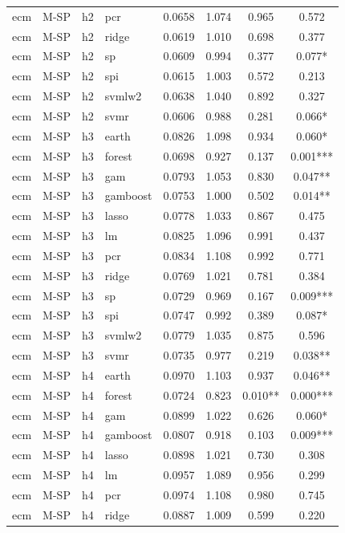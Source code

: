 \begin{ThreePartTable}
\begin{longtable}[t]{llclcccc}
ecm & M-SP & h2 & pcr & 0.0658 & 1.074 & 0.965 & 0.572\\
ecm & M-SP & h2 & ridge & 0.0619 & 1.010 & 0.698 & 0.377\\
ecm & M-SP & h2 & sp & 0.0609 & 0.994 & 0.377 & 0.077*\\
ecm & M-SP & h2 & spi & 0.0615 & 1.003 & 0.572 & 0.213\\
ecm & M-SP & h2 & svmlw2 & 0.0638 & 1.040 & 0.892 & 0.327\\
ecm & M-SP & h2 & svmr & 0.0606 & 0.988 & 0.281 & 0.066*\\
\addlinespace
ecm & M-SP & h3 & earth & 0.0826 & 1.098 & 0.934 & 0.060*\\
ecm & M-SP & h3 & forest & 0.0698 & 0.927 & 0.137 & 0.001***\\
ecm & M-SP & h3 & gam & 0.0793 & 1.053 & 0.830 & 0.047**\\
ecm & M-SP & h3 & gamboost & 0.0753 & 1.000 & 0.502 & 0.014**\\
ecm & M-SP & h3 & lasso & 0.0778 & 1.033 & 0.867 & 0.475\\
ecm & M-SP & h3 & lm & 0.0825 & 1.096 & 0.991 & 0.437\\
ecm & M-SP & h3 & pcr & 0.0834 & 1.108 & 0.992 & 0.771\\
ecm & M-SP & h3 & ridge & 0.0769 & 1.021 & 0.781 & 0.384\\
ecm & M-SP & h3 & sp & 0.0729 & 0.969 & 0.167 & 0.009***\\
ecm & M-SP & h3 & spi & 0.0747 & 0.992 & 0.389 & 0.087*\\
ecm & M-SP & h3 & svmlw2 & 0.0779 & 1.035 & 0.875 & 0.596\\
ecm & M-SP & h3 & svmr & 0.0735 & 0.977 & 0.219 & 0.038**\\
\addlinespace
ecm & M-SP & h4 & earth & 0.0970 & 1.103 & 0.937 & 0.046**\\
ecm & M-SP & h4 & forest & 0.0724 & 0.823 & 0.010** & 0.000***\\
ecm & M-SP & h4 & gam & 0.0899 & 1.022 & 0.626 & 0.060*\\
ecm & M-SP & h4 & gamboost & 0.0807 & 0.918 & 0.103 & 0.009***\\
ecm & M-SP & h4 & lasso & 0.0898 & 1.021 & 0.730 & 0.308\\
ecm & M-SP & h4 & lm & 0.0957 & 1.089 & 0.956 & 0.299\\
ecm & M-SP & h4 & pcr & 0.0974 & 1.108 & 0.980 & 0.745\\
ecm & M-SP & h4 & ridge & 0.0887 & 1.009 & 0.599 & 0.220\\

\end{longtable}
\end{ThreePartTable}
